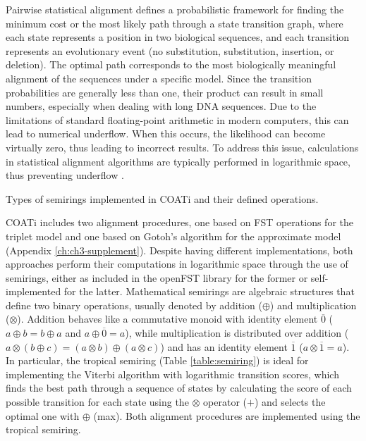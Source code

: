 Pairwise statistical alignment defines a probabilistic framework for finding the minimum cost or the most likely path through a state transition graph, where each state represents a position in two biological sequences, and each transition represents an evolutionary event (no substitution, substitution, insertion, or deletion). The optimal path corresponds to the most biologically meaningful alignment of the sequences under a specific model. Since the transition probabilities are generally less than one, their product can result in small numbers, especially when dealing with long DNA sequences. Due to the limitations of standard floating-point arithmetic in modern computers, this can lead to numerical underflow. When this occurs, the likelihood can become virtually zero, thus leading to incorrect results. To address this issue, calculations in statistical alignment algorithms are typically performed in logarithmic space, thus preventing underflow \citep{durbin1998biological}.

\begin{table}[!ht]
\centering

 \vspace{1mm}
 \caption[Semirings]{Types of semirings implemented in COATi and their defined operations.}
 \label{table:semiring}
\end{table}

COATi includes two alignment procedures, one based on FST operations for the triplet model and one based on Gotoh's \citeyearpar{gotoh_1982} algorithm for the approximate model (Appendix \ref{ch:ch3-supplement}). Despite having different implementations, both approaches perform their computations in logarithmic space through the use of semirings, either as included in the openFST library \citep{allauzen2007openfst} for the former or self-implemented for the latter. Mathematical semirings are algebraic structures that define two binary operations, usually denoted by addition ($\oplus$) and multiplication ($\otimes$). Addition behaves like a commutative monoid with identity element $\overline{0}$ ($a \oplus b = b \oplus a$ and $a \oplus \overline{0} = a$), while multiplication is distributed over addition ($a \otimes (b \oplus c) = (a \otimes b) \oplus (a \otimes c)$) and has an identity element $\overline{1}$ ($a \otimes \overline{1} = a$). In particular, the tropical semiring (Table \ref{table:semiring}) is ideal for implementing the Viterbi algorithm with logarithmic transition scores, which finds the best path through a sequence of states by calculating the score of each possible transition for each state using the $\otimes$ operator ($+$) and selects the optimal one with $\oplus$ (max). Both alignment procedures are implemented using the tropical semiring.

